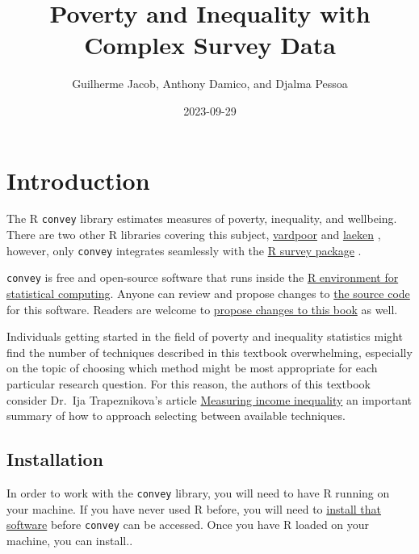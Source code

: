 \documentclass[
]{book}
\title{Poverty and Inequality with Complex Survey Data}
\author{Guilherme Jacob, Anthony Damico, and Djalma Pessoa}
\date{2023-09-29}
\begin{document}
\maketitle

{
\setcounter{tocdepth}{1}
\tableofcontents
}
\hypertarget{introduction}{%
\chapter{Introduction}\label{introduction}}

The R \texttt{convey} library estimates measures of poverty, inequality, and wellbeing. There are two other R libraries covering this subject, \href{https://CRAN.R-project.org/package=vardpoor}{vardpoor} \autocite{R-vardpoor} and \href{https://CRAN.R-project.org/package=laeken}{laeken} \autocite{R-laeken}, however, only \texttt{convey} integrates seamlessly with the \href{https://CRAN.R-project.org/package=survey}{R survey package} \autocite{R-survey-article,R-survey-book,R-survey}.

\texttt{convey} is free and open-source software that runs inside the \href{https://www.r-project.org/}{R environment for statistical computing}. Anyone can review and propose changes to \href{https://github.com/ajdamico/convey}{the source code} for this software. Readers are welcome to \href{https://github.com/guilhermejacob/context/}{propose changes to this book} as well.

Individuals getting started in the field of poverty and inequality statistics might find the number of techniques described in this textbook overwhelming, especially on the topic of choosing which method might be most appropriate for each particular research question. For this reason, the authors of this textbook consider Dr.~Ija Trapeznikova's article \href{https://wol.iza.org/articles/measuring-income-inequality/long}{Measuring income inequality} an important summary of how to approach selecting between available techniques.

\hypertarget{install}{%
\section{Installation}\label{install}}

In order to work with the \texttt{convey} library, you will need to have R running on your machine. If you have never used R before, you will need to \href{https://www.r-project.org/}{install that software} before \texttt{convey} can be accessed. Once you have R loaded on your machine, you can install..
\end{document}
